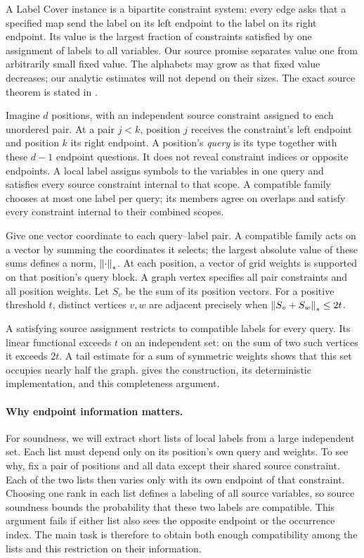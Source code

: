 A Label Cover instance is a bipartite constraint system: every edge
asks that a specified map send the label on its left endpoint to the
label on its right endpoint. Its value is the largest fraction of
constraints satisfied by one assignment of labels to all variables.
Our source promise separates value one from arbitrarily small fixed
value. The alphabets may grow as that fixed value decreases; our
analytic estimates will not depend on their sizes.
The exact source theorem is stated in .

Imagine \(d\) positions, with an independent source constraint
assigned to each unordered pair. At a pair \(j<k\), position
\(j\) receives the constraint's left endpoint and position \(k\)
its right endpoint. A position's \emph{query} is its type together
with these \(d-1\) endpoint questions. It does not reveal constraint
indices or opposite endpoints. A local label assigns symbols to the
variables in one query and satisfies every source constraint internal
to that scope. A compatible family chooses at most one label per query;
its members agree on overlaps and satisfy every constraint internal
to their combined scopes.

Give one vector coordinate to each query--label pair. A compatible
family acts on a vector by summing the coordinates it selects; the
largest absolute value of these sums defines a norm,
\(\left\|\cdot\right\|_*\). At each position, a vector of grid weights is
supported on that position's query block. A graph vertex specifies
all pair constraints and all position weights. Let \(S_v\) be
the sum of its position vectors. For a positive threshold \(t\),
distinct vertices \(v,w\) are adjacent precisely when
\(\left\|S_v+S_w\right\|_*\leq2t\).

A satisfying source assignment restricts to compatible labels for
every query. Its linear functional exceeds \(t\) on an independent
set: on the sum of two such vertices it exceeds \(2t\). A tail
estimate for a sum of symmetric weights shows that this set occupies
nearly half the graph.  gives the construction,
its deterministic implementation, and this completeness argument.

\paragraph{Why endpoint information matters.}
For soundness, we will extract short lists of local labels from a
large independent set. Each list must depend only on its position's
own query and weights. To see why, fix a pair of positions and all
data except their shared source constraint. Each of the two lists
then varies only with its own endpoint of that constraint. Choosing
one rank in each list defines a labeling of all source variables,
so source soundness bounds the probability that these two labels are
compatible. This argument fails if either list also sees the opposite
endpoint or the occurrence index. The main task is therefore to
obtain both enough compatibility among the lists and this restriction
on their information.

